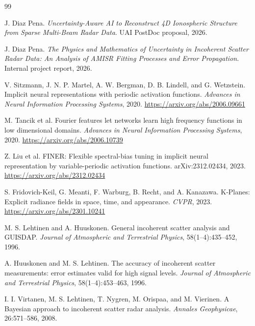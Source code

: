 \documentclass[11pt]{article}
\begin{document}
\begin{thebibliography}{99}

J. Diaz Pena.
\newblock \emph{Uncertainty-Aware AI to Reconstruct 4D Ionospheric Structure from Sparse Multi-Beam Radar Data}.
\newblock UAI PostDoc proposal, 2026.

J. Diaz Pena.
\newblock \emph{The Physics and Mathematics of Uncertainty in Incoherent Scatter Radar Data: An Analysis of AMISR Fitting Processes and Error Propagation}.
\newblock Internal project report, 2026.

V. Sitzmann, J. N. P. Martel, A. W. Bergman, D. B. Lindell, and G. Wetzstein.
\newblock Implicit neural representations with periodic activation functions.
\newblock \emph{Advances in Neural Information Processing Systems}, 2020.
\newblock \url{https://arxiv.org/abs/2006.09661}

M. Tancik et al.
\newblock Fourier features let networks learn high frequency functions in low dimensional domains.
\newblock \emph{Advances in Neural Information Processing Systems}, 2020.
\newblock \url{https://arxiv.org/abs/2006.10739}

Z. Liu et al.
\newblock FINER: Flexible spectral-bias tuning in implicit neural representation by variable-periodic activation functions.
\newblock arXiv:2312.02434, 2023.
\newblock \url{https://arxiv.org/abs/2312.02434}

S. Fridovich-Keil, G. Meanti, F. Warburg, B. Recht, and A. Kanazawa.
\newblock K-Planes: Explicit radiance fields in space, time, and appearance.
\newblock \emph{CVPR}, 2023.
\newblock \url{https://arxiv.org/abs/2301.10241}

M. S. Lehtinen and A. Huuskonen.
\newblock General incoherent scatter analysis and GUISDAP.
\newblock \emph{Journal of Atmospheric and Terrestrial Physics}, 58(1--4):435--452, 1996.

A. Huuskonen and M. S. Lehtinen.
\newblock The accuracy of incoherent scatter measurements: error estimates valid for high signal levels.
\newblock \emph{Journal of Atmospheric and Terrestrial Physics}, 58(1--4):453--463, 1996.

I. I. Virtanen, M. S. Lehtinen, T. Nygren, M. Orispaa, and M. Vierinen.
\newblock A Bayesian approach to incoherent scatter radar analysis.
\newblock \emph{Annales Geophysicae}, 26:571--586, 2008.


\end{thebibliography}
\end{document}
